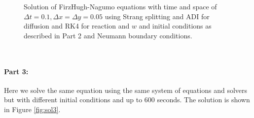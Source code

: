 \begin{figure}[tbh]
   
  \caption{Solution of FirzHugh-Nagumo equations with time and space of $\Delta t=0.1, \Delta x = \Delta y=0.05$ using Strang splitting and ADI for diffusion and RK4 for reaction and $w$ and initial conditions as described in Part 2 and Neumann boundary conditions.}
   \label{fig:sol1}
\end{figure} 
\

\paragraph{Part 3:}
Here we solve the same equation using the same system of equations and solvers but with different initial conditions and up to 600 seconds. The solution is shown in Figure \ref{fig:sol3}. 


